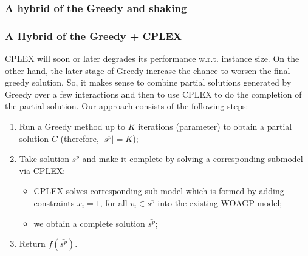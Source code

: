 \documentclass[runningheads,a4paper]{elsarticle}
\begin{document}
	\subsubsection{A hybrid of the Greedy and shaking}
	
	
	\subsubsection{A Hybrid of the Greedy + CPLEX} 
	CPLEX will soon or later degrades its performance w.r.t. instance size. On the other hand, the later stage of Greedy increase the chance to worsen the final greedy solution.  So, it makes sense to combine  partial solutions generated by  Greedy over a few interactions  and then to use CPLEX to do the completion of the partial solution. Our approach consists of the following steps:
	\begin{enumerate}
		\item Run a Greedy method up to $K$ iterations (parameter) to obtain a partial solution $C$ (therefore, $|s^p| = K$);
		\item Take solution $s^p$ and make it complete by solving a corresponding submodel via CPLEX:
		\begin{itemize}
			\item CPLEX solves corresponding sub-model which is formed by adding constraints $x_{i} = 1$, for all $v_i \in s^p$ into the existing WOAGP model;
			\item we obtain a complete solution $\bar {s^p}$;
		\end{itemize}
		\item Return $f(\bar {s^p})$.
	\end{enumerate}
	
	\begin{comment}
	
	\noindent \textbf{Improvements of the above method.} The above method can serve as a basic iteration
	of a more advanced techniques like ILP-LNS or CMSA. In this case, methods for destructing the solutions
	has to be proposed.  Underlying idea could be:
	\begin{itemize}
	\item remove $N$ guards with the largest costs out of $C'$
	\item remove $N$ guards which have a higher amount of points from $D(P)$ covered by other guards, represented by the function
	\begin{align}
	ratio(i) = \frac{\sum_{v \in V\setminus{ \{i\}}, j \in V(i)} 1_{j \mbox{ is veasible from } v} }{|V(i)|}.
	\end{align}
	\end{itemize}
	\end{comment}
	
\end{document}
